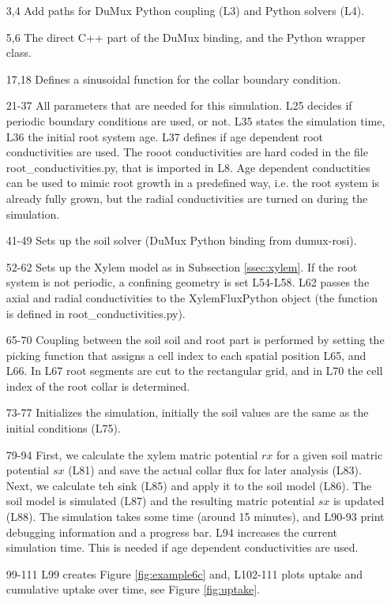 \begin{itemize}
\item[3,4] Add paths for DuMux Python coupling (L3) and Python solvers (L4).

\item[5,6] The direct C++ part of the DuMux binding, and the Python wrapper class. 

\item[17,18]  Defines a sinusoidal function for the collar boundary condition.

\item[21-37] All parameters that are needed for this simulation. L25 decides if periodic boundary conditions are used, or not. L35 states the simulation time, L36 the initial root system age. L37 defines if age dependent root conductivities are used. The rooot conductivities are hard coded in the file root\_conductivities.py, that is imported in L8. Age dependent conductities can be used to mimic root growth in a predefined way, i.e. the root system is already fully grown, but the radial conductivities are turned on during the simulation. 

\item[41-49] Sets up the soil solver (DuMux Python binding from dumux-rosi). 

\item[52-62] Sets up the Xylem model as in Subsection \ref{ssec:xylem}. If the root system is not periodic, a confining geometry is set L54-L58. L62 passes the axial and radial conductivities to the XylemFluxPython object (the function is defined in root\_conductivities.py).

\item[65-70] Coupling between the soil soil and root part is performed by setting the picking function that assigns a cell index to each spatial position L65, and L66. In L67 root segments are cut to the rectangular grid, and in L70 the cell index of the root collar is determined. 

\item[73-77] Initializes the simulation, initially the soil values are the same as the initial conditions (L75).

\item[79-94] First, we calculate the xylem matric potential $rx$ for a given soil matric potential $sx$ (L81) and save the actual collar flux for later analysis (L83). Next, we calculate teh sink (L85) and apply it to the soil model (L86). The soil model is simulated (L87) and the resulting matric potential $sx$ is updated (L88). The simulation takes some time (around 15 minutes), and L90-93 print debugging information and a progress bar. L94 increases the current simulation time. This is needed if age dependent conductivities are used. 

\item[99-111] L99 creates Figure \ref{fig:example6c} and, L102-111 plots uptake and cumulative uptake over time, see Figure \ref{fig:uptake}.
\end{itemize}

